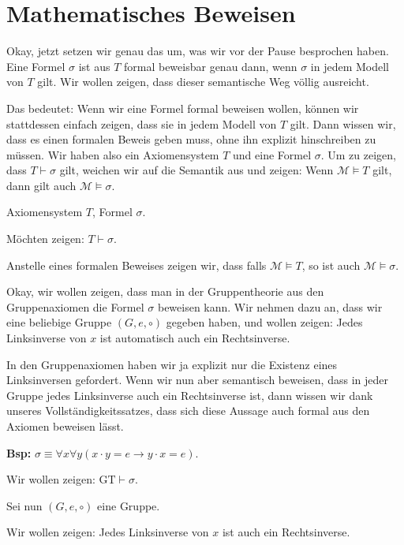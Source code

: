 \section*{Mathematisches Beweisen}

\begin{spoken-clean}[00:47:10 - 00:50:05]
Okay, jetzt setzen wir genau das um, was wir vor der Pause besprochen haben. Eine Formel $\sigma$ ist aus $T$ formal beweisbar genau dann, wenn $\sigma$ in jedem Modell von $T$ gilt. Wir wollen zeigen, dass dieser semantische Weg völlig ausreicht.

Das bedeutet: Wenn wir eine Formel formal beweisen wollen, können wir stattdessen einfach zeigen, dass sie in jedem Modell von $T$ gilt. Dann wissen wir, dass es einen formalen Beweis geben muss, ohne ihn explizit hinschreiben zu müssen. Wir haben also ein Axiomensystem $T$ und eine Formel $\sigma$. Um zu zeigen, dass $T \vdash \sigma$ gilt, weichen wir auf die Semantik aus und zeigen: Wenn $\mathcal{M} \models T$ gilt, dann gilt auch $\mathcal{M} \models \sigma$.
\end{spoken-clean}

\begin{math-stroke}
Axiomensystem $T$, Formel $\sigma$.

Möchten zeigen: $T \vdash \sigma$.

Anstelle eines formalen Beweises zeigen wir, dass falls $\mathcal{M} \models T$, so ist auch $\mathcal{M} \models \sigma$.
\end{math-stroke}

\begin{spoken-clean}[00:50:05 - 00:53:36]
Okay, wir wollen zeigen, dass man in der Gruppentheorie aus den Gruppenaxiomen die Formel $\sigma$ beweisen kann. Wir nehmen dazu an, dass wir eine beliebige Gruppe $(G, e, \circ)$ gegeben haben, und wollen zeigen: Jedes Linksinverse von $x$ ist automatisch auch ein Rechtsinverse.

In den Gruppenaxiomen haben wir ja explizit nur die Existenz eines Linksinversen gefordert. Wenn wir nun aber semantisch beweisen, dass in jeder Gruppe jedes Linksinverse auch ein Rechtsinverse ist, dann wissen wir dank unseres Vollständigkeitssatzes, dass sich diese Aussage auch formal aus den Axiomen beweisen lässt.
\end{spoken-clean}

\begin{math-stroke}
\textbf{Bsp:} $\sigma \equiv \forall x \forall y (x \cdot y = e \rightarrow y \cdot x = e)$.

Wir wollen zeigen: $\text{GT} \vdash \sigma$.

Sei nun $(G, e, \circ)$ eine Gruppe.

Wir wollen zeigen: Jedes Linksinverse von $x$ ist auch ein Rechtsinverse.
\end{math-stroke}

